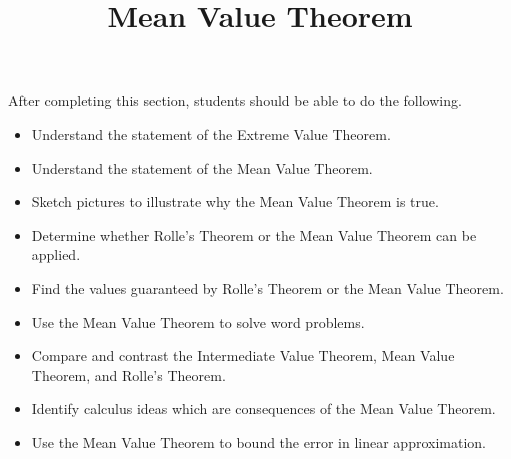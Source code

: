 \documentclass{ximera}
\title{Mean Value Theorem}
\begin{document}
\begin{abstract}
\end{abstract}

\maketitle

\begin{sectionOutcomes}

After completing this section, students should be able to do the following.

\begin{itemize}
\item Understand the statement of the Extreme Value Theorem.
\item Understand the statement of the Mean Value Theorem.
\item Sketch pictures to illustrate why the Mean Value Theorem is true.
\item Determine whether Rolle's Theorem or the Mean Value Theorem can be applied.
\item Find the values guaranteed by Rolle's Theorem or the Mean Value Theorem.
\item Use the Mean Value Theorem to solve word problems.
\item Compare and contrast the Intermediate Value Theorem, Mean Value Theorem, and Rolle's Theorem.
\item Identify calculus ideas which are consequences of the Mean Value Theorem.
\item Use the Mean Value Theorem to bound the error in linear approximation.
\end{itemize}

\end{sectionOutcomes}
\end{document}
